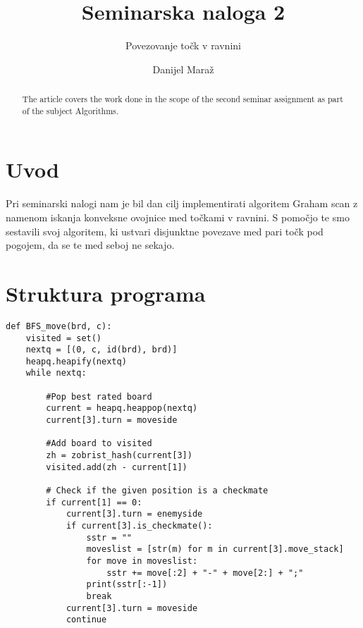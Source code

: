 \documentclass[runningheads]{llncs}
\begin{document}
\title{Seminarska naloga 2}
\subtitle{Povezovanje točk v ravnini}

\author{Danijel Maraž}



\maketitle             

\begin{abstract}
The article covers the work done in the scope of the second seminar assignment as part of the subject Algorithms. 

\end{abstract}

\section{Uvod}
Pri seminarski nalogi nam je bil dan cilj implementirati algoritem Graham scan z namenom iskanja konveksne ovojnice med točkami v ravnini. S pomočjo te smo sestavili svoj algoritem, ki ustvari disjunktne povezave med pari točk pod pogojem, da se te med seboj ne sekajo.

\section{Struktura programa}



\begin{lstlisting}
def BFS_move(brd, c):
    visited = set()
    nextq = [(0, c, id(brd), brd)]
    heapq.heapify(nextq)
    while nextq:
		
		#Pop best rated board
        current = heapq.heappop(nextq)
        current[3].turn = moveside
		
		#Add board to visited
        zh = zobrist_hash(current[3])
        visited.add(zh - current[1])
        
        # Check if the given position is a checkmate
        if current[1] == 0:
            current[3].turn = enemyside
            if current[3].is_checkmate():
                sstr = ""
                moveslist = [str(m) for m in current[3].move_stack]
                for move in moveslist:
                    sstr += move[:2] + "-" + move[2:] + ";"
                print(sstr[:-1])
                break
            current[3].turn = moveside
            continue
\end{lstlisting}
\end{document}
